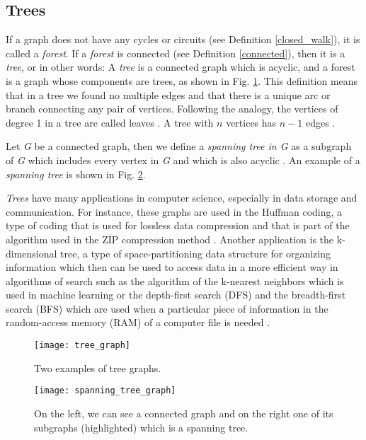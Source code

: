 \subsection{Trees}
\label{trees}
If a graph does not have any cycles or circuits (see Definition \ref{closed_walk}), it is called a \textit{forest}. If a \textit{forest} is connected (see Definition \ref{connected}), then it is a \textit{tree}, or in other words: A \textit{tree} is a connected graph which is acyclic, and a forest is a graph whose components are trees, as shown in Fig. \ref{fig:tree_graph}. This definition means that in a tree we found no multiple edges and that there is a unique arc or branch connecting any pair of vertices. Following the analogy, the vertices of degree 1 in a tree are called leaves \cite{diestel}. A tree with $n$ vertices has $n-1$ edges \cite{oystein}.

Let \textit{G} be a connected graph, then we define a \textit{spanning tree in G} as a subgraph of \textit{G} which includes every vertex in \textit{G} and which is also acyclic \cite{wilsonwatkins}. An example of a \textit{spanning tree} is shown in Fig. \ref{fig:spanning_tree_graph}.

\textit{Trees} have many applications in computer science, especially in data storage and communication. For instance, these graphs are used in the Huffman coding, a type of coding that is used for lossless data compression and that is part of the algorithm used in the ZIP compression method \cite{douglas}. Another application is the k-dimensional tree, a type of space-partitioning data structure for organizing information which then can be used to access data in a more efficient way in algorithms of search such as the algorithm of the k-nearest neighbors which is used in machine learning or the depth-first search (DFS) and the breadth-first search (BFS) which are used when a particular piece of information in the random-access memory (RAM) of a computer file is needed \cite{wilsonwatkins}.


\begin{figure}
	\centering
		\texttt{[image: tree\_graph]}
	\caption{Two examples of tree graphs.}
	\label{fig:tree_graph}
\end{figure}

\begin{figure}
	\centering
		\texttt{[image: spanning\_tree\_graph]}
	\caption[An example of a spanning tree.]{On the left, we can see a connected graph and on the right one of its subgraphs (highlighted) which is a spanning tree.}
	\label{fig:spanning_tree_graph}
\end{figure}

